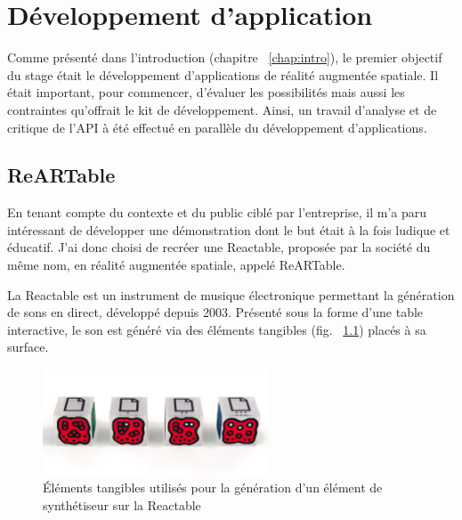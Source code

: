 \chapter{Développement d'application}

Comme présenté dans l'introduction (chapitre ~\ref{chap:intro}), le premier objectif du stage était le développement d'applications de réalité augmentée spatiale. Il était important, pour commencer, d'évaluer les possibilités mais aussi les contraintes qu'offrait le kit de développement. 
Ainsi, un travail d'analyse et de critique de l'API à été effectué en parallèle du développement d'applications.

\section{ReARTable}
\label{sec:reartable}
En tenant compte du contexte et du public ciblé par l'entreprise, il m'a paru intéressant de développer une démonstration dont le but était à la fois ludique et éducatif. J'ai donc choisi de recréer une Reactable\cite{reactable}, proposée par la société du même nom, en réalité augmentée spatiale, appelé ReARTable.

La Reactable est un instrument de musique électronique permettant la génération de sons en direct, développé depuis 2003. Présenté sous la forme d'une table interactive, le son est généré via des éléments tangibles (fig. ~\ref{fig:reactelem}) placés à sa surface. 

\begin{figure}[H]
\centering
\includegraphics[width=0.6\textwidth]{images/reactelements}
\caption{Éléments tangibles utilisés pour la génération d'un élément de synthétiseur sur la Reactable\protect\footnotemark}
\label{fig:reactelem}
\end{figure}


